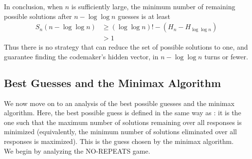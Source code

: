 \documentclass[12pt, a4paper]{article}
\begin{document}
 	In conclusion, when $n$ is sufficiently large, the minimum number of remaining
	possible solutions after $n - \log\log n$ guesses is at least
		\begin{align*}
		S_n(n-\log\log n) & \ge (\log\log n)! - (H_n - H_{\log\log n})\\
		& > 1
		\end{align*}
	Thus there is no strategy that can reduce the set of possible solutions to
	one, and guarantee finding the codemaker's hidden vector, in $n-\log\log n$
	turns or fewer.
\subsection{Best Guesses and the Minimax Algorithm}
We now move on to an analysis of the best possible guesses and the minimax algorithm. Here, 
the best possible guess is defined in the same way as \cite{DK76}: it is the one such that the 
maximum number of solutions remaining over all responses is minimized (equivalently, the 
minimum number of solutions eliminated over all responses is maximized). This is the guess
chosen by the minimax algorithm. \\
We begin by analyzing the NO-REPEATS game.
\end{document}
